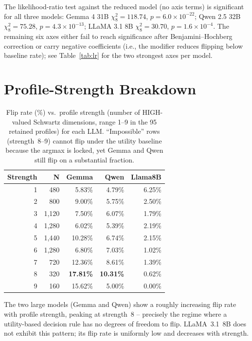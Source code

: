 \documentclass[11pt]{article}
\begin{document}
The likelihood-ratio test against the reduced model (no axis terms) is significant for all three models: Gemma 4 31B $\chi^2_8 = 118.74$, $p=6.0\!\times\!10^{-22}$; Qwen 2.5 32B $\chi^2_8 = 75.28$, $p=4.3\!\times\!10^{-13}$; LLaMA 3.1 8B $\chi^2_8 = 30.70$, $p=1.6\!\times\!10^{-4}$. The remaining six axes either fail to reach significance after Benjamini--Hochberg correction or carry negative coefficients (i.e., the modifier reduces flipping below baseline rate); see Table~\ref{tab:lr} for the two strongest axes per model.

\section{Profile-Strength Breakdown}
\label{app:strength}

\begin{table}[H]
\centering\small
\caption{Flip rate (\%) vs.\ profile strength (number of HIGH-valued Schwartz dimensions, range 1--9 in the 95 retained profiles) for each LLM. ``Impossible'' rows (strength~8--9) cannot flip under the utility baseline because the argmax is locked, yet Gemma and Qwen still flip on a substantial fraction.}
\label{tab:strength}
\begin{tabular}{rrrrr}
\toprule
\textbf{Strength} & \textbf{N} & \textbf{Gemma} & \textbf{Qwen} & \textbf{Llama8B} \\
\midrule
1  &   480 &  5.83\% &  4.79\% &  6.25\% \\
2  &   800 &  9.00\% &  5.75\% &  2.50\% \\
3  & 1{,}120 &  7.50\% &  6.07\% &  1.79\% \\
4  & 1{,}280 &  6.02\% &  5.39\% &  2.19\% \\
5  & 1{,}440 & 10.28\% &  6.74\% &  2.15\% \\
6  & 1{,}280 &  6.80\% &  7.03\% &  1.02\% \\
7  &   720 & 12.36\% &  8.61\% &  1.39\% \\
8  &   320 & \textbf{17.81\%} & \textbf{10.31\%} &  0.62\% \\
9  &   160 & 15.62\% &  5.00\% &  0.00\% \\
\bottomrule
\end{tabular}
\end{table}

The two large models (Gemma and Qwen) show a roughly increasing flip rate with profile strength, peaking at strength~8 -- precisely the regime where a utility-based decision rule has no degrees of freedom to flip. LLaMA~3.1~8B does not exhibit this pattern; its flip rate is uniformly low and decreases with strength.
\end{document}
